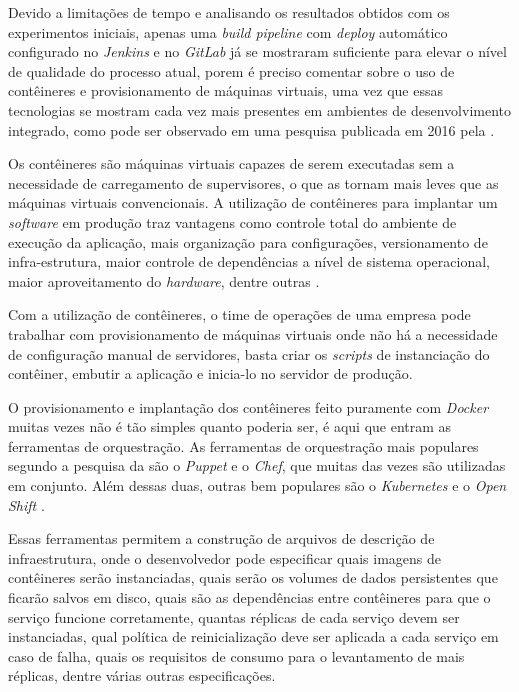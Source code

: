\documentclass[
	12pt,				%
	openright,			%
	oneside,			%
	a4paper,			%
	english,			%
	french,				%
	spanish,			%
	brazil,				%
	]{abntex2}
\begin{document}
Devido a limitações de tempo e analisando os resultados obtidos com os experimentos iniciais, apenas uma \textit{build pipeline} com \textit{deploy} automático configurado no \textit{Jenkins} e no \textit{GitLab} já se mostraram suficiente para elevar o nível de qualidade do processo atual, porem é preciso comentar sobre o uso de contêineres e provisionamento de máquinas virtuais, uma vez que essas tecnologias se mostram cada vez mais presentes em ambientes de desenvolvimento integrado, como pode ser observado em uma pesquisa publicada em 2016 pela .

Os contêineres são máquinas virtuais capazes de serem executadas sem a necessidade de carregamento de supervisores, o que as tornam mais leves que as máquinas virtuais convencionais. A utilização de contêineres para implantar um \textit{software} em produção traz vantagens como controle total do ambiente de execução da aplicação, mais organização para configurações, versionamento de infra-estrutura, maior controle de dependências a nível de sistema operacional, maior aproveitamento do \textit{hardware}, dentre outras \cite{JamesTurbull:DockerBook}.

Com a utilização de contêineres, o time de operações de uma empresa pode trabalhar com provisionamento de máquinas virtuais onde não há a necessidade de configuração manual de servidores, basta criar os \textit{scripts} de instanciação do contêiner, embutir a aplicação e inicia-lo no servidor de produção.

O provisionamento e implantação dos contêineres feito puramente com \textit{Docker} muitas vezes não é tão simples quanto poderia ser, é aqui que entram as ferramentas de orquestração. As ferramentas de orquestração mais populares segundo a pesquisa da  são o \textit{Puppet} e o \textit{Chef}, que muitas das vezes são utilizadas em conjunto. Além dessas duas, outras bem populares são o 
\textit{Kubernetes} \cite{Kubernetes:Orchestration} e o \textit{Open Shift} \cite{OpenShift:Orchestration}.

Essas ferramentas permitem a construção de arquivos de descrição de infraestrutura, onde o desenvolvedor pode especificar quais imagens de contêineres serão instanciadas, quais serão os volumes de dados persistentes que ficarão salvos em disco, quais são as dependências entre contêineres para que o serviço funcione corretamente, quantas réplicas de cada serviço devem ser instanciadas, qual política de reinicialização deve ser aplicada a cada serviço em caso de falha, quais os requisitos de consumo para o levantamento de mais réplicas, dentre várias outras especificações.
\end{document}
